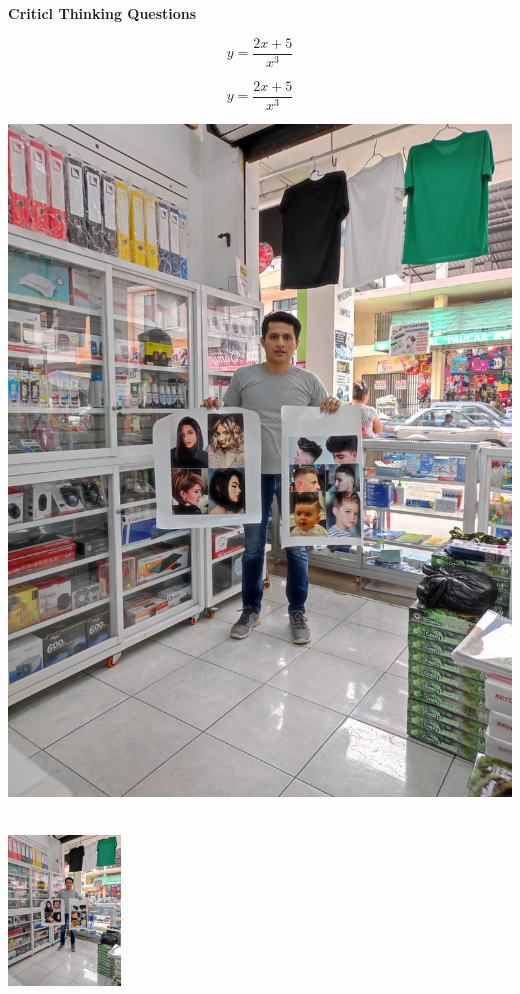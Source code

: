 \documentclass[10pt,letterpaper]{article}
\def\eq1{y=\dfrac{2x+5}{x^3}}
\begin{document}
\textbf{Criticl Thinking Questions}


$$\eq1$$



$$\eq1$$





\includegraphics[scale=0.2]{one}


\begin{center}
\includegraphics[width=3cm,height=5cm]{one}
\end{center}
\end{document}
